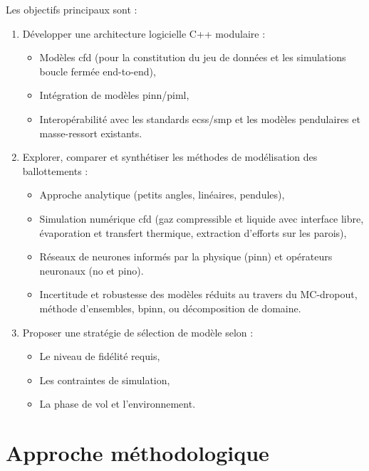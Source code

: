 \documentclass[12pt]{article}
\begin{document}
	Les objectifs principaux sont :
	\begin{enumerate}
		\item Développer une architecture logicielle C++ modulaire :
		\begin{itemize}
			\item Modèles \acrshort{cfd} (pour la constitution du jeu de données et les simulations boucle fermée end-to-end),
			\item Intégration de modèles \gls{pinn}/\acrshort{piml},
			\item Interopérabilité avec les standards \acrshort{ecss}/\acrshort{smp} et les modèles pendulaires et masse-ressort existants.
		\end{itemize}
		\item Explorer, comparer et synthétiser les méthodes de modélisation des ballottements :
		\begin{itemize}
			\item Approche analytique (petits angles, linéaires, pendules),
			\item Simulation numérique \acrshort{cfd} (gaz compressible et liquide avec interface libre, évaporation et transfert thermique, extraction d'efforts sur les parois),
			\item Réseaux de neurones informés par la physique (\gls{pinn}) et opérateurs neuronaux (\acrshort{no} et \acrshort{pino}).
			\item Incertitude et robustesse des modèles réduits au travers du MC-dropout, méthode d'ensembles, \acrshort{bpinn}, ou décomposition de domaine.
		\end{itemize}
		\item Proposer une stratégie de sélection de modèle selon :
		\begin{itemize}
			\item Le niveau de fidélité requis,
			\item Les contraintes de simulation,
			\item La phase de vol et l'environnement.
		\end{itemize}
	\end{enumerate}
	
	
	\section*{Approche méthodologique}
	
\end{document}
